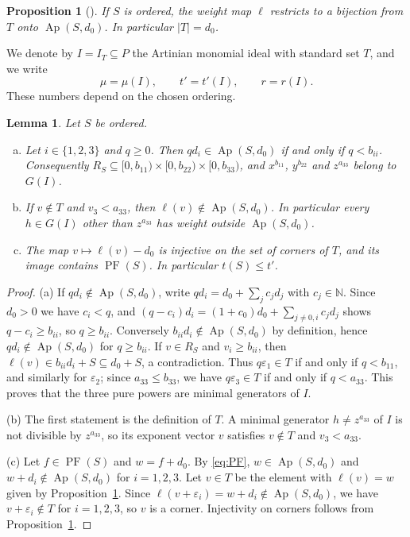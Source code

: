 \documentclass{amsart}
\newtheorem{proposition}[theorem]{Proposition}
\newtheorem{lemma}[theorem]{Lemma}
\theoremstyle{definition}
\theoremstyle{remark}
\numberwithin{equation}{section}
\newcommand{\N}{\mathbb{N}}
\newcommand{\Ap}{\operatorname{Ap}}
\DeclareMathOperator{\PF}{PF}
\newcommand{\wt}{\ell}
\newcommand{\Apd}{\Ap(S,d_0)}
\begin{document}
\begin{proposition}[{\cite[Theorem~2.4 and Propositions~2.7 and 2.8]{Cho26}}]\label{prop:staircase}
If $S$ is ordered, the weight map $\wt$ restricts to a bijection from $T$ onto $\Apd$. In particular $|T|=d_0$.
\end{proposition}

We denote by $I=I_T\subseteq P$ the Artinian monomial ideal with standard set $T$, and we write
\[
\mu=\mu(I),\qquad t'=t'(I),\qquad r=r(I).
\]
These numbers depend on the chosen ordering.

\begin{lemma}\label{lem:basic}
Let $S$ be ordered.
\begin{enumerate}[(a)]
\item Let $i\in\{1,2,3\}$ and $q\ge0$. Then $qd_i\in\Apd$ if and only if $q<b_{ii}$. Consequently $R_S\subseteq[0,b_{11})\times[0,b_{22})\times[0,b_{33})$, and $x^{b_{11}}$, $y^{b_{22}}$ and $z^{a_{33}}$ belong to $G(I)$.
\item If $v\notin T$ and $v_3<a_{33}$, then $\wt(v)\notin\Apd$. In particular every $h\in G(I)$ other than $z^{a_{33}}$ has weight outside $\Apd$.
\item The map $v\mapsto\wt(v)-d_0$ is injective on the set of corners of $T$, and its image contains $\PF(S)$. In particular $t(S)\le t'$.
\end{enumerate}
\end{lemma}

\begin{proof}
(a) If $qd_i\notin\Apd$, write $qd_i=d_0+\sum_jc_jd_j$ with $c_j\in\N$. Since $d_0>0$ we have $c_i<q$, and $(q-c_i)d_i=(1+c_0)d_0+\sum_{j\neq0,i}c_jd_j$ shows $q-c_i\ge b_{ii}$, so $q\ge b_{ii}$. Conversely $b_{ii}d_i\notin\Apd$ by definition, hence $qd_i\notin\Apd$ for $q\ge b_{ii}$. If $v\in R_S$ and $v_i\ge b_{ii}$, then $\wt(v)\in b_{ii}d_i+S\subseteq d_0+S$, a contradiction. Thus $q\varepsilon_1\in T$ if and only if $q<b_{11}$, and similarly for $\varepsilon_2$; since $a_{33}\le b_{33}$, we have $q\varepsilon_3\in T$ if and only if $q<a_{33}$. This proves that the three pure powers are minimal generators of $I$.

(b) The first statement is the definition of $T$. A minimal generator $h\neq z^{a_{33}}$ of $I$ is not divisible by $z^{a_{33}}$, so its exponent vector $v$ satisfies $v\notin T$ and $v_3<a_{33}$.

(c) Let $f\in\PF(S)$ and $w=f+d_0$. By \eqref{eq:PF}, $w\in\Apd$ and $w+d_i\notin\Apd$ for $i=1,2,3$. Let $v\in T$ be the element with $\wt(v)=w$ given by Proposition~\ref{prop:staircase}. Since $\wt(v+\varepsilon_i)=w+d_i\notin\Apd$, we have $v+\varepsilon_i\notin T$ for $i=1,2,3$, so $v$ is a corner. Injectivity on corners follows from Proposition~\ref{prop:staircase}.
\end{proof}
\end{document}
